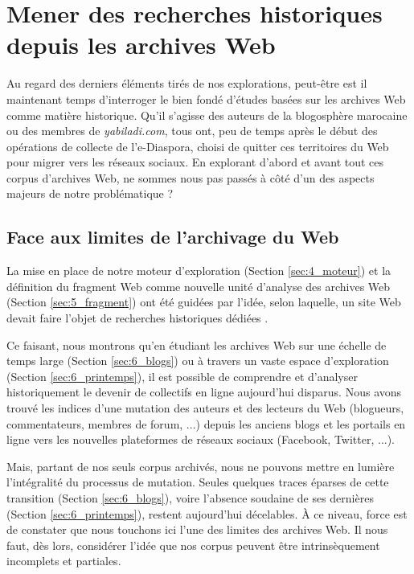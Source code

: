 \documentclass[symmetric,justified,marginals=raggedouter]{tufte-book}
\begin{document}
\section{Mener des recherches historiques depuis les archives Web}
\label{sec:6_moment}

\noindent Au regard des derniers éléments tirés de nos explorations, peut-être est il maintenant temps d'interroger le bien fondé d'études basées sur les archives Web comme matière historique. Qu'il s'agisse des auteurs de la blogosphère marocaine ou des membres de \textit{yabiladi.com}, tous ont, peu de temps  après le début des opérations de collecte de l'e-Diaspora, choisi de quitter ces territoires du Web pour migrer vers les réseaux sociaux. En explorant d'abord et avant tout ces corpus d'archives Web, ne sommes nous pas passés à côté d'un des aspects majeurs de notre problématique ?

\subsection{Face aux limites de l'archivage du Web}

\noindent La mise en place de notre moteur d'exploration (Section \ref{sec:4_moteur}) et la définition du fragment Web comme nouvelle unité d'analyse des archi\-ves Web (Section \ref{sec:5_fragment}) ont été guidées par l'idée, selon laquelle, un site Web devait faire l'objet de recherches historiques dédiées \citep{brugger_web_2017}. 

Ce faisant, nous montrons qu'en étudiant les archives Web sur une échelle de temps large (Section \ref{sec:6_blogs}) ou à travers un vaste espace d'explo\-ration (Section \ref{sec:6_printemps}), il est possible de comprendre et d'analyser historiquement le devenir de collectifs en ligne aujourd'hui disparus. Nous avons trouvé les indices d'une mutation des auteurs et des lecteurs du Web (blogueurs, commentateurs, membres de forum, ...) depuis les anciens blogs et les portails en ligne vers les nouvelles plateformes de réseaux sociaux (Facebook, Twitter, ...). 

Mais, partant de nos seuls corpus archivés, nous ne pouvons mettre en lumière l'intégralité du processus de mutation. Seules quelques traces éparses de cette transition (Section \ref{sec:6_blogs}), voire l'absence soudaine de ses dernières (Section \ref{sec:6_printemps}), restent aujourd'hui décelables. À ce niveau, force est de constater que nous touchons ici l'une des limites des archives Web. Il nous faut, dès lors, considérer l'idée que nos corpus peuvent être intrinsèquement incomplets et partiales. 
\end{document}
